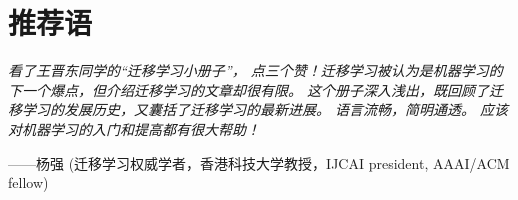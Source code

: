 \documentclass[a4paper]{article}
\begin{document}
\thispagestyle{empty}
\section*{推荐语}

\textit{看了王晋东同学的“迁移学习小册子”， 点三个赞！迁移学习被认为是机器学习的下一个爆点，但介绍迁移学习的文章却很有限。 这个册子深入浅出，既回顾了迁移学习的发展历史，又囊括了迁移学习的最新进展。 语言流畅，简明通透。 应该对机器学习的入门和提高都有很大帮助！}

——杨强 (迁移学习权威学者，香港科技大学教授，IJCAI president, AAAI/ACM fellow)

\newpage
\setcounter{page}{1}
\begin{center}
\tableofcontents
\end{center}
\newpage























\end{document}

